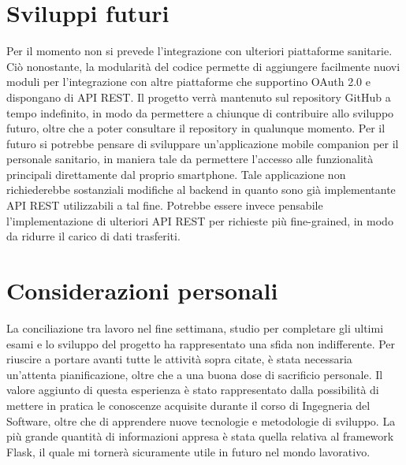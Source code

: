 \documentclass[12pt,a4paper,oneside]{report}
\begin{document}
\section{Sviluppi futuri}
Per il momento non si prevede l'integrazione con ulteriori piattaforme sanitarie. Ciò nonostante, la modularità del codice permette di aggiungere facilmente nuovi moduli per l'integrazione con altre piattaforme che supportino OAuth 2.0 e dispongano di API REST.
Il progetto verrà mantenuto sul repository GitHub a tempo indefinito, in modo da permettere a chiunque di contribuire allo sviluppo futuro, oltre che a poter consultare il repository in qualunque momento.
Per il futuro si potrebbe pensare di sviluppare un'applicazione mobile companion per il personale sanitario, in maniera tale da permettere l'accesso alle funzionalità principali direttamente dal proprio smartphone.
Tale applicazione non richiederebbe sostanziali modifiche al backend in quanto sono già implementante API REST utilizzabili a tal fine. Potrebbe essere invece pensabile l'implementazione di ulteriori API REST per richieste più fine-grained, in modo da ridurre il carico di dati trasferiti.
\section{Considerazioni personali}
La conciliazione tra lavoro nel fine settimana, studio per completare gli ultimi esami e lo sviluppo del progetto ha rappresentato una sfida non indifferente.
Per riuscire a portare avanti tutte le attività sopra citate, è stata necessaria un'attenta pianificazione, oltre che a una buona dose di sacrificio personale.
Il valore aggiunto di questa esperienza è stato rappresentato dalla possibilità di mettere in pratica le conoscenze acquisite durante il corso di Ingegneria del Software, oltre che di apprendere nuove tecnologie e metodologie di sviluppo.
La più grande quantità di informazioni appresa è stata quella relativa al framework Flask, il quale mi tornerà sicuramente utile in futuro nel mondo lavorativo.
\appendix
\end{document}
